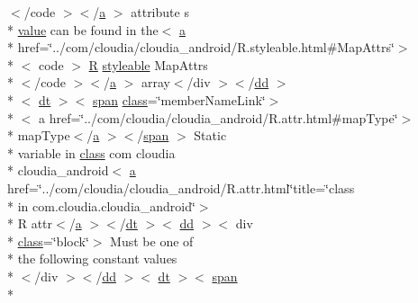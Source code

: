 \begin{DoxyCompactItemize}
$<$/code $>$$<$/\hyperlink{style_8css_a5e8981582017bb8b84c21f148345d1f7}{a} $>$ attribute s \\*
\hyperlink{_my_s_q_l_connector_8measure_8html_afcc7a4b78ecd8fa7e713f8cfa0f51017}{value} can be found in the$<$ \hyperlink{style_8css_a5e8981582017bb8b84c21f148345d1f7}{a} \\*
href=\char`\"{}../com/cloudia/cloudia\-\_\-android/R.\-styleable.\-html\#Map\-Attrs\char`\"{}$>$\\*
$<$ code $>$ \hyperlink{index-16_8html_a31e8fe59be5c20ce90a0090e28a0c1fe}{R} \hyperlink{index-17_8html_ae6c9bf1e41380184b4b665ca9ab6ba0a}{styleable} Map\-Attrs\\*
$<$/code $>$$<$/\hyperlink{style_8css_a5e8981582017bb8b84c21f148345d1f7}{a} $>$ array$<$/div $>$$<$/\hyperlink{stylesheet_8css_a47f4718a86835a7771ec592ece845221}{dd} $>$\\*
$<$ \hyperlink{stylesheet_8css_a107565fb4039d33b041380d6e0ea1d80}{dt} $>$$<$ \hyperlink{stylesheet_8css_a8343996ebcf16220b04e54659aac31cc}{span} \hyperlink{_tools_8html_acf06f836132665ba8114f5a414c2403f}{class}=\char`\"{}member\-Name\-Link\char`\"{}$>$\\*
$<$ a href=\char`\"{}../com/cloudia/cloudia\-\_\-android/R.\-attr.\-html\#map\-Type\char`\"{}$>$\\*
 map\-Type$<$/\hyperlink{style_8css_a5e8981582017bb8b84c21f148345d1f7}{a} $>$$<$/\hyperlink{stylesheet_8css_a8343996ebcf16220b04e54659aac31cc}{span} $>$ Static \\*
variable in \hyperlink{_tools_8html_acf06f836132665ba8114f5a414c2403f}{class} com cloudia \\*
cloudia\-\_\-android$<$ \hyperlink{style_8css_a5e8981582017bb8b84c21f148345d1f7}{a} href=\char`\"{}../com/cloudia/cloudia\-\_\-android/R.\-attr.\-html\char`\"{}title=\char`\"{}class \\*
in com.\-cloudia.\-cloudia\-\_\-android\char`\"{}$>$\\*
 R attr$<$/\hyperlink{style_8css_a5e8981582017bb8b84c21f148345d1f7}{a} $>$$<$/\hyperlink{stylesheet_8css_a107565fb4039d33b041380d6e0ea1d80}{dt} $>$$<$ \hyperlink{stylesheet_8css_a47f4718a86835a7771ec592ece845221}{dd} $>$$<$ div \\*
\hyperlink{_tools_8html_acf06f836132665ba8114f5a414c2403f}{class}=\char`\"{}block\char`\"{}$>$ Must be one of \\*
the following constant values\\*
$<$/div $>$$<$/\hyperlink{stylesheet_8css_a47f4718a86835a7771ec592ece845221}{dd} $>$$<$ \hyperlink{stylesheet_8css_a107565fb4039d33b041380d6e0ea1d80}{dt} $>$$<$ \hyperlink{stylesheet_8css_a8343996ebcf16220b04e54659aac31cc}{span} \\*
$$
\end{DoxyCompactItemize}
